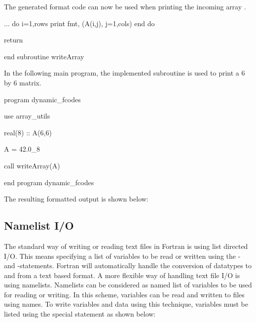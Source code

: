 The generated format code can now be used when printing the incoming array .

\begin{fortrancodeenv}
	...
	do i=1,rows
		print fmt, (A(i,j), j=1,cols)
	end do
		
	return
	
end subroutine writeArray
\end{fortrancodeenv}

In the following main program, the implemented  subroutine is used to print a 6 by 6 matrix.

\begin{fortrancodeenv}
program dynamic_fcodes

	use array_utils

	real(8) :: A(6,6)
	
	A = 42.0_8
	
	call writeArray(A)
	
end program dynamic_fcodes
\end{fortrancodeenv}

The resulting formatted output is shown below:

\cmdmode


\fmode

\subsection{Namelist I/O}

The standard way of writing or reading text files in Fortran is using list directed I/O. This means specifying a list of variables to be read or written using the - and -statements. Fortran will automatically handle the conversion of datatypes to and from a text based format. A more flexible way of handling text file I/O is using namelists. Namelists can be considered as named list of variables to be used for reading or writing. In this scheme, variables can be read and written to files using names. To write variables and data using this technique, variables must be listed using the special  statement as shown below:


